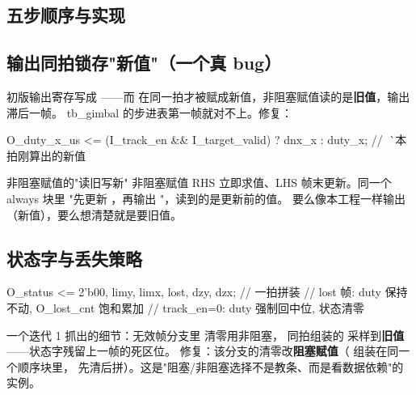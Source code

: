 \subsection{五步顺序与实现}


\subsection{输出同拍锁存"新值"（一个真 bug）}

初版输出寄存写成 ——而 
在同一拍才被赋成新值，非阻塞赋值读的是\textbf{旧值}，输出滞后一帧。
tb\_gimbal 的步进表第一帧就对不上。修复：

\begin{Verilog}
O_duty_x_us <= (I_track_en && I_target_valid) ? dnx_x : duty_x;
//                              ^^^^^ 本拍刚算出的新值
\end{Verilog}

\begin{warnbox}{非阻塞赋值的"读旧写新"}
非阻塞赋值 RHS 立即求值、LHS 帧末更新。同一个 always 块里
"先更新 ，再输出 "，读到的是更新前的值。
要么像本工程一样输出 （新值），要么想清楚就是要旧值。
\end{warnbox}

\subsection{状态字与丢失策略}

\begin{Verilog}
O_status <= {2'b00, limy, limx, lost, dzy, dzx};   // 一拍拼装
// lost 帧: duty 保持不动, O_lost_cnt 饱和累加
// track_en=0: duty 强制回中位, 状态清零
\end{Verilog}

一个迭代 1 抓出的细节：无效帧分支里  清零用非阻塞，
同拍组装的  采样到\textbf{旧值}——状态字残留上一帧的死区位。
修复：该分支的清零改\textbf{阻塞赋值}（ 组装在同一个顺序块里，
先清后拼）。这是"阻塞/非阻塞选择不是教条、而是看数据依赖"的实例。

